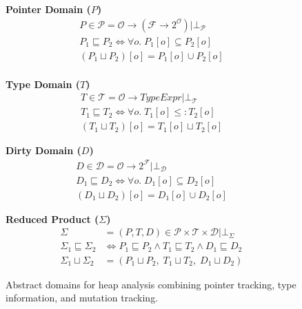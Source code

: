 \begin{figure*}[t]
\centering

\begin{minipage}[t]{0.32\textwidth}
\centering
\textbf{Pointer Domain ($P$)}
\begin{gather*}
P \in \mathcal{P} = \mathcal{O} \to (\mathcal{F} \to 2^{\mathcal{O}}) | \bot_\mathcal{P} \\[0.3em]
P_1 \sqsubseteq P_2 \iff \forall o.\; P_1[o] \subseteq P_2[o] \\[0.3em]
(P_1 \sqcup P_2)[o] = P_1[o] \cup P_2[o] \\
\end{gather*}
\end{minipage}%
\hfill
\begin{minipage}[t]{0.32\textwidth}
\centering
\textbf{Type Domain ($T$)}
\begin{gather*}
T \in \mathcal{T} = \mathcal{O} \to \mathit{TypeExpr} | \bot_\mathcal{T} \\[0.3em]
T_1 \sqsubseteq T_2 \iff \forall o.\; T_1[o] \leq: T_2[o] \\[0.3em]
(T_1 \sqcup T_2)[o] = T_1[o] \sqcup T_2[o]
\end{gather*}
\end{minipage}%
\hfill
\begin{minipage}[t]{0.32\textwidth}
\centering
\textbf{Dirty Domain ($D$)}
\begin{gather*}
D \in \mathcal{D} = \mathcal{O} \to 2^{\mathcal{F}} | \bot_\mathcal{D} \\[0.3em]
D_1 \sqsubseteq D_2 \iff \forall o.\; D_1[o] \subseteq D_2[o] \\[0.3em]
(D_1 \sqcup D_2)[o] = D_1[o] \cup D_2[o]
\end{gather*}
\end{minipage}

\vspace{1.5em}

\noindent\textbf{Reduced Product ($\Sigma$)}
\begin{align*}
\Sigma &= (P,T,D) \in \mathcal{P} \times \mathcal{T} \times \mathcal{D} | \bot_\Sigma\\[0.3em]
\Sigma_1 \sqsubseteq \Sigma_2 &\iff P_1 \sqsubseteq P_2 \land T_1 \sqsubseteq T_2 \land D_1 \sqsubseteq D_2 \\[0.3em]
\Sigma_1 \sqcup \Sigma_2 &= (P_1 \sqcup P_2,\; T_1 \sqcup T_2,\; D_1 \sqcup D_2)
\end{align*}

\caption{Abstract domains for heap analysis combining pointer tracking, type information, and mutation tracking.}
\label{fig:abstract-domains}
\end{figure*}

